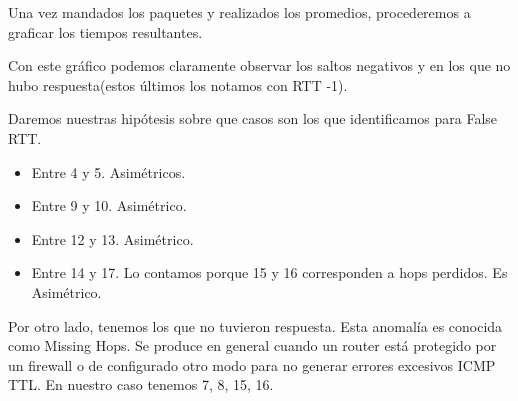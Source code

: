 Una vez mandados los paquetes y realizados los promedios, procederemos a graficar los tiempos resultantes.

\begin{figure}[H]
    \centering
\end{figure}

Con este gráfico podemos claramente observar los saltos negativos y en los que no hubo respuesta(estos
últimos los notamos con RTT -1).



Daremos nuestras hipótesis sobre que casos son los que identificamos para False RTT.

\begin{itemize}
\item Entre 4 y 5. Asimétricos.
\item Entre 9 y 10. Asimétrico.
\item Entre 12 y 13. Asimétrico.
\item Entre 14 y 17. Lo contamos porque 15 y 16 corresponden a hops perdidos. Es Asimétrico.
\end{itemize}

Por otro lado, tenemos los que no tuvieron respuesta. Esta anomalía es conocida como Missing Hops.
Se produce en general cuando un router está protegido por un firewall o de configurado otro modo para no
generar errores excesivos ICMP TTL. En nuestro caso tenemos 7, 8, 15, 16.

